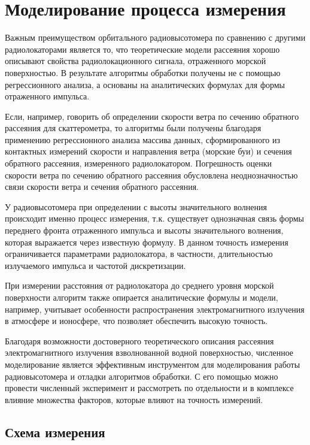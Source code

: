 
\section{Моделирование процесса измерения}

Важным преимуществом орбитального радиовысотомера по сравнению с другими
радиолокаторами является то, что теоретические модели рассеяния хорошо
описывают свойства радиолокационного сигнала, отраженного морской поверхностью.
В результате алгоритмы обработки получены не с помощью регрессионного анализа,
а основаны на аналитических формулах для формы отраженного импульса.

Если, например, говорить об определении скорости ветра по сечению обратного
рассеяния для скаттерометра, то алгоритмы были получены благодаря применению
регрессионного анализа массива данных, сформированного из контактных измерений
скорости и направления ветра (морские буи) и сечения обратного рассеяния,
измеренного радиолокатором. Погрешность оценки скорости ветра
по сечению обратного рассеяния обусловлена неоднозначностью связи скорости
ветра и сечения обратного рассеяния.

У радиовысотомера при определении с высоты значительного волнения происходит
именно процесс измерения, т.к. существует однозначная связь формы переднего
фронта отраженного импульса и высоты значительного волнения, которая выражается
через известную формулу. В данном точность измерения ограничивается параметрами
радиолокатора, в частности, длительностью излучаемого импульса и частотой
дискретизации.

При измерении расстояния от радиолокатора до среднего уровня морской
поверхности алгоритм также опирается аналитические формулы и модели, например,
учитывает особенности распространения электромагнитного излучения в атмосфере и
ионосфере, что позволяет обеспечить высокую точность.

Благодаря возможности достоверного теоретического  описания рассеяния
электромагнитного излучения взволнованной водной поверхностью, численное
моделирование является эффективным инструментом для моделирования работы
радиовысотомера и отладки алгоритмов обработки. С его помощью можно провести
численный эксперимент и рассмотреть по отдельности и в комплексе влияние
множества факторов, которые влияют на точность измерений.

\subsection{Схема измерения}%
\label{sub:skhema_izmereniia}


